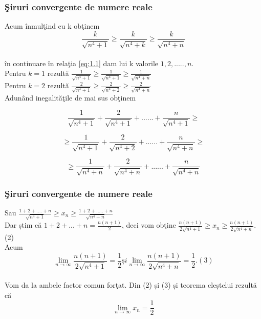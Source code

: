 \documentclass{beamer}
\theoremstyle{plain}
\begin{document}
\frame
{
\frametitle{\c Siruri convergente de numere reale}


Acum \^ inmul\c tind cu k ob\c tinem 
\begin{displaymath}
\frac{k}{\sqrt{n^{4}+1}}\geq \frac{k}{\sqrt{n^{4}+k}}\geq \frac{k}{\sqrt{n^{4}+n}} \label{eq:1.1} \tag{1.1}
\end{displaymath}
\\ \^ in continuare \^ in rela\c tia \ref{eq:1.1} dam lui k valorile \(1,2,.....,n\). 
\\Pentru \( k = 1\) rezult\u a
\(\frac{1}{\sqrt{n^{4}+1}}\geq \frac{1}{\sqrt{n^{4}+1}}\geq \frac{1}{\sqrt{n^{4}+n}}\)
\\ Pentru \( k = 2\) rezult\u a
 \(\frac{2}{\sqrt{n^{4}+1}}\geq \frac{2}{\sqrt{n^{4}+2}}\geq \frac{2}{\sqrt{n^{4}+n}}\)
\\ Adun\^ and inegalit\u a\c tile de mai sus ob\c tinem 

\begin{displaymath}
 \frac{1}{\sqrt{n^{4}+1}}+ \frac{2}{\sqrt{n^{4}+1}}+......+ \frac{n}{\sqrt{n^{4}+1}} \geq 
\end{displaymath}
 
\begin{displaymath}
 \geq \frac{1}{\sqrt{n^{4}+1}}+ \frac{2}{\sqrt{n^{4}+2}}+......+ \frac{n}{\sqrt{n^{4}+n}}\geq
\end{displaymath}
 
\begin{displaymath}
 \geq \frac{1}{\sqrt{n^{4}+n}}+ \frac{2}{\sqrt{n^{4}+n}}+......+ \frac{n}{\sqrt{n^{4}+n}}
\end{displaymath}

}
\frame
{
\frametitle{\c Siruri convergente de numere reale}
Sau \(\frac{1+2+....+n}{\sqrt{n^{4}+1}}\geq x_{n}\geq \frac{1+2+.....+n}{\sqrt{n^{4}+n}}\)
 \\ Dar știm c\u a \(1+2+...+n = \frac{n(n+1)}{2}\), 
 deci vom ob\c tine \(\frac{n(n+1)}{2\sqrt{n^{4}+1}}\geq x_{n}\geq \frac{n(n+1)}{2\sqrt{n^{4}+n}}\). (2)
\\ Acum 
\begin{displaymath}
 \lim_{n \to \infty }\frac{n(n+1)}{2\sqrt{n^{4}+1}}=\frac{1}{2} și \lim_{n \to \infty }\frac{n(n+1)}{2\sqrt{n^{4}+n}}=\frac{1}{2}. (3)
\end{displaymath}
\\ Vom da la ambele factor comun for\c tat. Din (2) și (3) și teorema cleștelui rezult\u a c\u a
\begin{displaymath}
 \lim_{n \to \infty }x_{n}=\frac{1}{2}
\end{displaymath}
}
\end{document}
